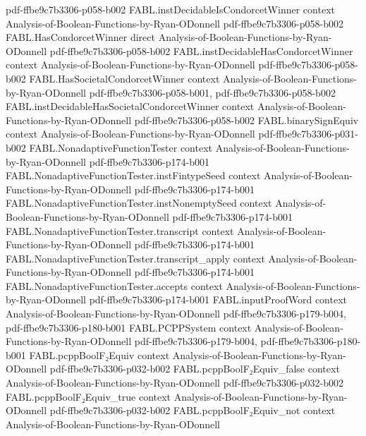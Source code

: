 \begin{theorem}
  {pdf-ffbe9c7b3306-p058-b002}
\proofstep
  {FABL.instDecidableIsCondorcetWinner}
  {context}
  {Analysis-of-Boolean-Functions-by-Ryan-ODonnell}
  {pdf-ffbe9c7b3306-p058-b002}
\proofstep
  {FABL.HasCondorcetWinner}
  {direct}
  {Analysis-of-Boolean-Functions-by-Ryan-ODonnell}
  {pdf-ffbe9c7b3306-p058-b002}
\proofstep
  {FABL.instDecidableHasCondorcetWinner}
  {context}
  {Analysis-of-Boolean-Functions-by-Ryan-ODonnell}
  {pdf-ffbe9c7b3306-p058-b002}
\proofstep
  {FABL.HasSocietalCondorcetWinner}
  {context}
  {Analysis-of-Boolean-Functions-by-Ryan-ODonnell}
  {pdf-ffbe9c7b3306-p058-b001,
    pdf-ffbe9c7b3306-p058-b002}
\proofstep
  {FABL.instDecidableHasSocietalCondorcetWinner}
  {context}
  {Analysis-of-Boolean-Functions-by-Ryan-ODonnell}
  {pdf-ffbe9c7b3306-p058-b002}
\proofstep
  {FABL.binarySignEquiv}
  {context}
  {Analysis-of-Boolean-Functions-by-Ryan-ODonnell}
  {pdf-ffbe9c7b3306-p031-b002}
\proofstep
  {FABL.NonadaptiveFunctionTester}
  {context}
  {Analysis-of-Boolean-Functions-by-Ryan-ODonnell}
  {pdf-ffbe9c7b3306-p174-b001}
\proofstep
  {FABL.NonadaptiveFunctionTester.instFintypeSeed}
  {context}
  {Analysis-of-Boolean-Functions-by-Ryan-ODonnell}
  {pdf-ffbe9c7b3306-p174-b001}
\proofstep
  {FABL.NonadaptiveFunctionTester.instNonemptySeed}
  {context}
  {Analysis-of-Boolean-Functions-by-Ryan-ODonnell}
  {pdf-ffbe9c7b3306-p174-b001}
\proofstep
  {FABL.NonadaptiveFunctionTester.transcript}
  {context}
  {Analysis-of-Boolean-Functions-by-Ryan-ODonnell}
  {pdf-ffbe9c7b3306-p174-b001}
\proofstep
  {FABL.NonadaptiveFunctionTester.transcript_apply}
  {context}
  {Analysis-of-Boolean-Functions-by-Ryan-ODonnell}
  {pdf-ffbe9c7b3306-p174-b001}
\proofstep
  {FABL.NonadaptiveFunctionTester.accepts}
  {context}
  {Analysis-of-Boolean-Functions-by-Ryan-ODonnell}
  {pdf-ffbe9c7b3306-p174-b001}
\proofstep
  {FABL.inputProofWord}
  {context}
  {Analysis-of-Boolean-Functions-by-Ryan-ODonnell}
  {pdf-ffbe9c7b3306-p179-b004,
    pdf-ffbe9c7b3306-p180-b001}
\proofstep
  {FABL.PCPPSystem}
  {context}
  {Analysis-of-Boolean-Functions-by-Ryan-ODonnell}
  {pdf-ffbe9c7b3306-p179-b004,
    pdf-ffbe9c7b3306-p180-b001}
\proofstep
  {FABL.pcppBoolF₂Equiv}
  {context}
  {Analysis-of-Boolean-Functions-by-Ryan-ODonnell}
  {pdf-ffbe9c7b3306-p032-b002}
\proofstep
  {FABL.pcppBoolF₂Equiv_false}
  {context}
  {Analysis-of-Boolean-Functions-by-Ryan-ODonnell}
  {pdf-ffbe9c7b3306-p032-b002}
\proofstep
  {FABL.pcppBoolF₂Equiv_true}
  {context}
  {Analysis-of-Boolean-Functions-by-Ryan-ODonnell}
  {pdf-ffbe9c7b3306-p032-b002}
\proofstep
  {FABL.pcppBoolF₂Equiv_not}
  {context}
  {Analysis-of-Boolean-Functions-by-Ryan-ODonnell}

\end{theorem}
